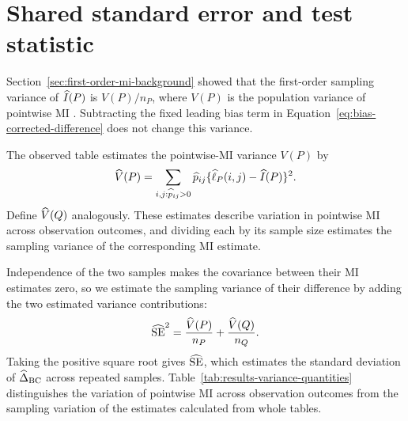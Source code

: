 \section{Shared standard error and test statistic}

Section~\ref{sec:first-order-mi-background} showed that the first-order
sampling variance of \(\widehat I(P)\) is \(V(P)/n_P\), where \(V(P)\) is the
population variance of pointwise MI \citep{moddemeijer1989,brillinger2004}.
Subtracting the fixed leading bias term
in Equation~\eqref{eq:bias-corrected-difference} does not change this
variance.

The observed table estimates the pointwise-MI variance \(V(P)\) by
\begin{equation}
  \widehat V(P)
  =\sum_{i,j:\widehat p_{ij}>0}
  \widehat p_{ij}
  \{\widehat{\ell}_P(i,j)-\widehat I(P)\}^2.
  \label{eq:estimated-mi-variance}
\end{equation}
Define \(\widehat V(Q)\) analogously.
These estimates describe variation in pointwise MI across observation
outcomes, and dividing each by its sample size estimates the sampling variance
of the corresponding MI estimate.

Independence of the two samples makes the covariance between their MI
estimates zero, so we estimate the sampling variance of their difference
by adding the two estimated variance contributions:
\begin{equation}
  \widehat{\operatorname{SE}}^2
  =\frac{\widehat V(P)}{n_P}
  +\frac{\widehat V(Q)}{n_Q}.
  \label{eq:shared-se}
\end{equation}
Taking the positive square root gives \(\widehat{\operatorname{SE}}\), which estimates the
standard deviation of \(\widehat\Delta_{\mathrm{BC}}\) across repeated samples.
Table~\ref{tab:results-variance-quantities} distinguishes the variation of
pointwise MI across observation outcomes from the sampling variation of
the estimates calculated from whole tables.

